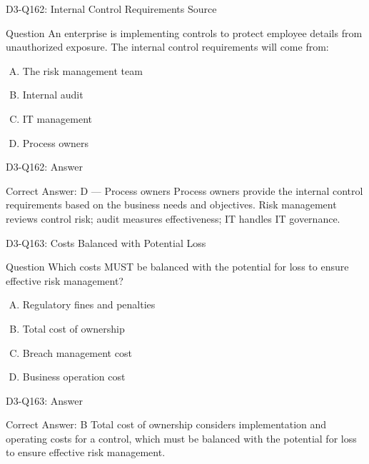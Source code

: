 \documentclass{beamer}
\begin{document}
	\begin{frame}{D3-Q162: Internal Control Requirements Source}
		\begin{block}{Question}
			An enterprise is implementing controls to protect employee details from unauthorized exposure. The internal control requirements will come from:
		\end{block}
		\begin{enumerate}[(A)]
			\item The risk management team
			\item Internal audit
			\item IT management
			\item Process owners
		\end{enumerate}
	\end{frame}
	\begin{frame}{D3-Q162: Answer}
		\begin{block}{Correct Answer: D --- Process owners}
			Process owners provide the internal control requirements based on the business needs and objectives. Risk management reviews control risk; audit measures effectiveness; IT handles IT governance.
		\end{block}
	\end{frame}
	
	\begin{frame}{D3-Q163: Costs Balanced with Potential Loss}
		\begin{block}{Question}
			Which costs MUST be balanced with the potential for loss to ensure effective risk management?
		\end{block}
		\begin{enumerate}[(A)]
			\item Regulatory fines and penalties
			\item Total cost of ownership
			\item Breach management cost
			\item Business operation cost
		\end{enumerate}
	\end{frame}
	\begin{frame}{D3-Q163: Answer}
		\begin{block}{Correct Answer: B}
			Total cost of ownership considers implementation and operating costs for a control, which must be balanced with the potential for loss to ensure effective risk management.
		\end{block}
	\end{frame}
	
\end{document}
